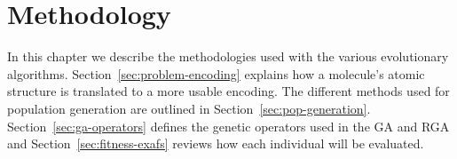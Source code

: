\chapter{Methodology}

In this chapter we describe the methodologies used with the various evolutionary algorithms. Section~\ref{sec:problem-encoding} explains how a molecule's atomic structure is translated to a more usable encoding. The different methods used for population generation are outlined in Section~\ref{sec:pop-generation}. Section~\ref{sec:ga-operators} defines the genetic operators used in the GA and RGA and Section~\ref{sec:fitness-exafs} reviews how each individual will be evaluated.





% 